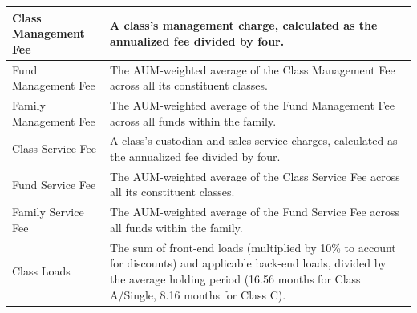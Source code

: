 \begin{longtable}{lp{}}
    \midrule
    Class Management Fee           & A class's management charge, calculated as the annualized fee divided by four.                                                                                                                                                                                                                                    \\
    \midrule
    Fund Management Fee            & The AUM-weighted average of the Class Management Fee across all its constituent classes.                                                                                                                                                                                                                          \\
    \midrule
    Family Management Fee          & The AUM-weighted average of the Fund Management Fee across all funds within the family.                                                                                                                                                                                                                           \\
    \midrule
    Class Service Fee              & A class's custodian and sales service charges, calculated as the annualized fee divided by four.                                                                                                                                                                                                                  \\
    \midrule
    Fund Service Fee               & The AUM-weighted average of the Class Service Fee across all its constituent classes.                                                                                                                                                                                                                             \\
    \midrule
    Family Service Fee             & The AUM-weighted average of the Fund Service Fee across all funds within the family.                                                                                                                                                                                                                              \\
    \midrule
    Class Loads                    & The sum of front-end loads (multiplied by 10\% to account for discounts) and applicable back-end loads, divided by the average holding period (16.56 months for Class A/Single, 8.16 months for Class C).                                                                                                         \\

\end{longtable}
